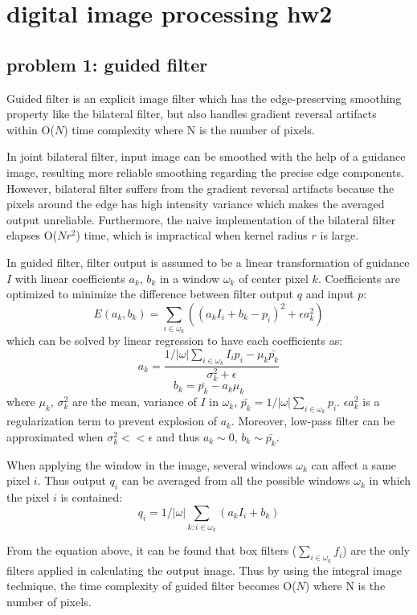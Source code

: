 \documentclass[extendedabs]{bmvc2k}
\begin{document}
\section*{digital image processing hw2}
\subsection*{problem 1: guided filter}

Guided filter \cite{guided} is an explicit image filter which has the edge-preserving 
smoothing property like the bilateral filter, but also handles gradient reversal artifacts
within O($N$) time complexity where N is the number of pixels.

In joint bilateral filter, input image can be smoothed with the help of a guidance image,
resulting more reliable smoothing regarding the precise edge components. However,
bilateral filter suffers from the gradient reversal artifacts because the pixels around
the edge has high intensity variance which makes the averaged output unreliable. 
Furthermore, the naive implementation of the bilateral filter elapses O($Nr^2$) time, 
which is impractical when kernel radius $r$ is large.

In guided filter, filter output is assumed to be a linear transformation of guidance $I$
with linear coefficients $a_k$, $b_k$ in a window $\omega_k$ of center pixel $k$.
Coefficients are optimized to minimize the difference between filter output $q$ and input $p$:
\[E(a_k,b_k) = \sum_{i \in \omega_k}((a_kI_i + b_k - p_i)^2 + \epsilon a_k^2)\]
which can be solved by linear regression to have each coefficients as:
\[a_k=\frac{1/|\omega|\sum_{i \in \omega_k}I_ip_i - \mu_k\bar{p_k}}{\sigma_k^2+\epsilon}\]
\[b_k=\bar{p_k} - a_k\mu_k\]
where $\mu_k$, $\sigma_k^2$ are the mean, variance of $I$ in $\omega_k$, 
$\bar{p_k}=1/|\omega|\sum_{i \in \omega_k}p_i$.
$\epsilon a_k^2$ is a regularization term to prevent explosion of $a_k$.
Moreover, low-pass filter can be approximated when $\sigma_k^2 << \epsilon$ and thus
$a_k \sim 0$, $b_k \sim \bar{p_k}$.

When applying the window in the image, several windows $\omega_k$ can affect a same pixel $i$.
Thus output $q_i$ can be averaged from all the possible windows $\omega_k$ in which the pixel $i$
is contained:
\[q_i = 1/|\omega|\sum_{k:i \in \omega_k}(a_kI_i + b_k)\]

From the equation above, it can be found that box filters ($\sum_{i \in \omega_k}f_i$) are 
the only filters applied in calculating the output image. 
Thus by using the integral image technique, 
the time complexity of guided filter becomes O($N$) where N is the number of pixels.
\end{document}
